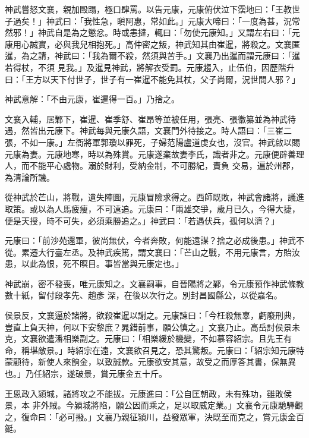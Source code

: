 \begin{pinyinscope}
 神武嘗怒文襄，親加毆蹋，極口肆罵。以告元康，元康俯伏泣下霑地曰：「王教世子過矣！」神武曰：「我性急，瞋阿惠，常如此。」元康大啼曰：「一度為甚，況常然邪！」神武自是為之懲忿。時或恚撻，輒曰：「勿使元康知。」又謂左右曰：「元康用心誠實，必與我兒相抱死。」高仲密之叛，神武知其由崔暹，將殺之。文襄匿暹，為之請，神武曰：「我為爾不殺，然須與苦手。」文襄乃出暹而謂元康曰：「暹若得杖，不須
 見我。」及暹見神武，將解衣受罰。元康趨入，止伍伯，因歷階升曰：「王方以天下付世子，世子有一崔暹不能免其杖，父子尚爾，況世間人邪？」



 神武意解：「不由元康，崔暹得一百。」乃捨之。



 文襄入輔，居鄴下，崔暹、崔季舒、崔昂等並被任用，張亮、張徽纂並為神武待遇，然皆出元康下。神武每與元康久語，文襄門外待接之。時人語曰：「三崔二張，不如一康。」左衙將軍郭瓊以罪死，子婦范陽盧道虔女也，沒官。神武啟以賜元康為妻。元康地寒，時以為殊賞。元康遂棄故妻李氏，識者非之。元康便辟善理人，而不能平心處物。溺於財利，受納金制，不可勝紀，責負
 交易，遍於州郡，為清論所譏。



 從神武於芒山，將戰，遺失陣圖，元康冒險求得之。西師既敗，神武會諸將，議進取策。或以為人馬疲瘦，不可遠追。元康曰：「兩雄交爭，歲月已久，今得大捷，便是天授，時不可失，必須乘勝追之。」神武曰：「若遇伏兵，孤何以濟？」



 元康曰：「前沙苑還軍，彼尚無伏，今者奔敗，何能遠謀？捨之必成後患。」神武不從。累遷大行臺左丞。及神武疾篤，謂文襄曰：「芒山之戰，不用元康言，方貽汝患，以此為恨，死不瞑目。事皆當與元康定也。」



 神武崩，密不發喪，唯元康知之。文襄嗣事，自晉陽將之鄴，令元康預作神武條教數十紙，留付段孝先、趙彥
 深，在後以次行之。別封昌國縣公，以從嘉名。



 侯景反，文襄逼於諸將，欲殺崔暹以謝之。元康諫曰：「今枉殺無辜，虧廢刑典，豈直上負天神，何以下安黎庶？晁錯前事，願公慎之。」文襄乃止。高岳討侯景未克，文襄欲遣潘相樂副之。元康曰：「相樂緩於機變，不如慕容紹宗。且先王有命，稱堪敵景。」時紹宗在遠，文襄欲召見之，恐其驚叛。元康曰：「紹宗知元康特蒙顧待，新使人來餉金，以致誠款。元康欲安其意，故受之而厚答其書，保無異也。」乃任紹宗，遂破景，賞元康金五十斤。



 王恩政入潁城，諸將攻之不能拔。元康進曰：「公自匡朝政，未有殊功，雖敗侯景，本
 非外賊。今潁城將陷，願公因而乘之，足以取威定業。」文襄令元康馳驛觀之，復命曰：「必可撥。」文襄乃親征潁川，益發眾軍，決既至而克之，賞元康金百鋌。




\end{pinyinscope}
